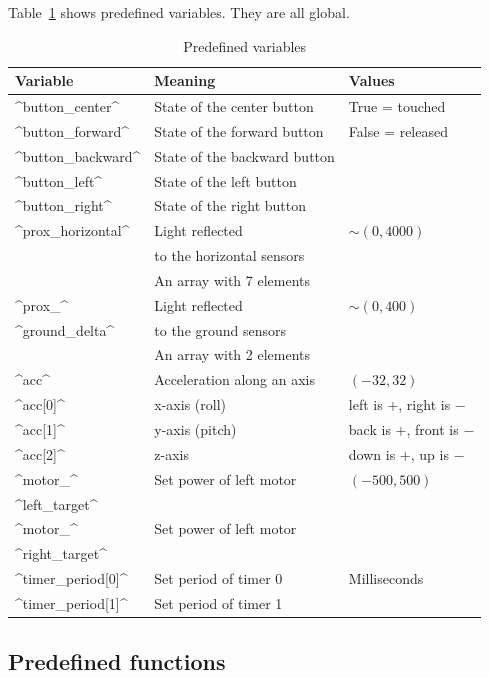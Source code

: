 \documentclass[11pt,a4paper]{article}
\begin{document}
Table~\ref{t.variables} shows predefined variables. They are all global.
\begin{table}[hbt]
\renewcommand{\arraystretch}{.85}
\begin{center}
\begin{tabular}{|l|l|l|}
\hline
Variable& Meaning & Values\\\hline
^button_center^&State of the center button&True = touched\\
^button_forward^&State of the forward button&False = released\\
^button_backward^&State of the backward button&\\
^button_left^&State of the left button&\\
^button_right^&State of the right button&\\
\hline
^prox_horizontal^&Light reflected&$\sim(0,4000)$\\
&to the horizontal sensors&\\
&An array with 7 elements&\\
\hline
^prox_^&Light reflected&$\sim(0,400)$\\
\hspace{15pt}^ground_delta^&to the ground sensors&\\
&An array with 2 elements&\\
\hline
^acc^&Acceleration along an axis&$(-32,32)$\\
^acc[0]^&x-axis (roll)& left is $+$, right is $-$\\
^acc[1]^&y-axis (pitch)& back is $+$, front is $-$\\
^acc[2]^&z-axis& down is $+$, up is $-$\\
\hline
^motor_^&Set power of left motor&$(-500,500)$\\
\hspace{15pt}^left_target^&&\\
^motor_^&Set power of left motor&\\
\hspace{15pt}^right_target^&&\\
\hline
^timer_period[0]^&Set period of timer 0&Milliseconds\\
^timer_period[1]^&Set period of timer 1&\\
\hline
\end{tabular}
\end{center}
\caption{Predefined variables}\label{t.variables}
\end{table}

\subsection{Predefined functions}
\end{document}

